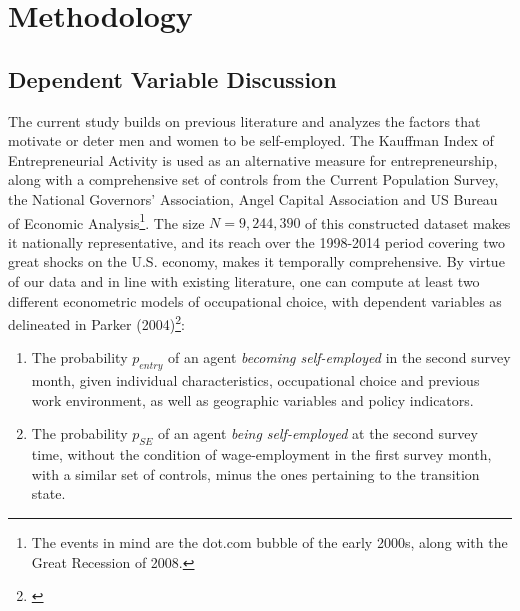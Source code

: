 \chapter{Methodology\label{ch:methods}}


\section {Dependent Variable Discussion}

The current study builds on previous literature and analyzes the factors that motivate or deter men and women to be self-employed. The Kauffman Index of Entrepreneurial Activity is used as an alternative measure for entrepreneurship, along with a comprehensive set of controls from the Current Population Survey, the National Governors' Association,  Angel Capital Association and US Bureau of Economic Analysis\footnote{The events in mind are the dot.com bubble of the early 2000s, along with the Great Recession of 2008.}. The size $N = 9,244,390$ of this constructed dataset makes it nationally representative, and its reach over the 1998-2014 period covering two great shocks on the U.S. economy, makes it temporally comprehensive. By virtue of our data and in line with existing literature, one can compute at least two different econometric models of occupational choice, with dependent variables as delineated in Parker (2004)\footnote{\cite{Parker2004}}: 
\begin{enumerate}
\item The probability $p_{entry}$ of an agent \textit{becoming self-employed} in the second survey month, given individual characteristics, occupational choice and previous work environment, as well as geographic variables and policy indicators.
\item The probability $p_{SE}$ of an agent \textit{being self-employed} at the second survey time, without the condition of wage-employment in the first survey month, with a similar set of controls, minus the ones pertaining to the transition state. 
\end{enumerate}
